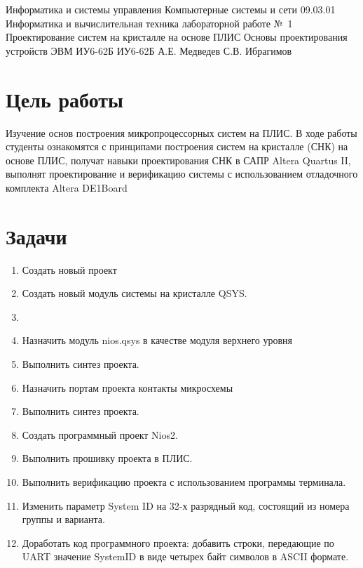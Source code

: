 \documentclass{bmstu}
\begin{document}



\makereporttitle
    {Информатика и системы управления} %
    {Компьютерные системы и сети} %
    {09.03.01 Информатика и вычислительная техника} %
    {лабораторной работе №~1} %
    {Проектирование систем на кристалле на основе ПЛИС} %
    {Основы проектирования устройств ЭВМ} %
    {} %
    {ИУ6-62Б} %
    {
    	{ИУ6-62Б}
    	{А.Е. Медведев} %
    	{С.В. Ибрагимов} %
    } 

\section*{Цель работы}
Изучение основ построения микропроцессорных систем на ПЛИС. В ходе работы студенты
ознакомятся с принципами построения систем на кристалле (СНК) на основе ПЛИС, получат
навыки проектирования СНК в САПР Altera Quartus II, выполнят проектирование и
верификацию системы с использованием отладочного комплекта Altera DE1Board

\section*{Задачи}
\begin{enumerate}
\item Создать новый проект
\item Создать новый модуль системы на кристалле QSYS.
\item {}
\item Назначить модуль nios.qsys в качестве модуля верхнего уровня
\item Выполнить синтез проекта.
\item Назначить портам проекта контакты микросхемы
\item Выполнить синтез проекта. 
\item Создать программный проект Nios2.
\item Выполнить прошивку проекта в ПЛИС.
\item Выполнить верификацию проекта с использованием программы терминала.
\item Изменить параметр System ID на 32-х разрядный код, состоящий из номера группы и варианта.
\item Доработать код программного проекта: добавить строки, передающие по UART значение SystemID в виде четырех байт символов в ASCII формате.

\end{enumerate}
\end{document}

